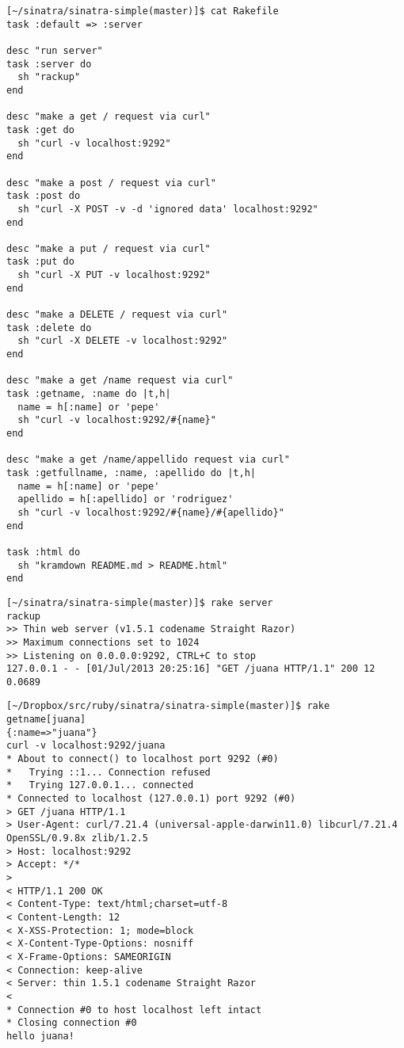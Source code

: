 \begin{verbatim}
[~/sinatra/sinatra-simple(master)]$ cat Rakefile 
task :default => :server

desc "run server"
task :server do
  sh "rackup"
end

desc "make a get / request via curl"
task :get do
  sh "curl -v localhost:9292"
end

desc "make a post / request via curl"
task :post do
  sh "curl -X POST -v -d 'ignored data' localhost:9292"
end

desc "make a put / request via curl"
task :put do
  sh "curl -X PUT -v localhost:9292"
end

desc "make a DELETE / request via curl"
task :delete do
  sh "curl -X DELETE -v localhost:9292"
end

desc "make a get /name request via curl"
task :getname, :name do |t,h|
  name = h[:name] or 'pepe'
  sh "curl -v localhost:9292/#{name}"
end

desc "make a get /name/appellido request via curl"
task :getfullname, :name, :apellido do |t,h|
  name = h[:name] or 'pepe'
  apellido = h[:apellido] or 'rodriguez'
  sh "curl -v localhost:9292/#{name}/#{apellido}"
end

task :html do
  sh "kramdown README.md > README.html"
end
\end{verbatim}


\begin{verbatim}
[~/sinatra/sinatra-simple(master)]$ rake server
rackup
>> Thin web server (v1.5.1 codename Straight Razor)
>> Maximum connections set to 1024
>> Listening on 0.0.0.0:9292, CTRL+C to stop
127.0.0.1 - - [01/Jul/2013 20:25:16] "GET /juana HTTP/1.1" 200 12 0.0689
\end{verbatim}


\begin{verbatim}
[~/Dropbox/src/ruby/sinatra/sinatra-simple(master)]$ rake getname[juana]
{:name=>"juana"}
curl -v localhost:9292/juana
* About to connect() to localhost port 9292 (#0)
*   Trying ::1... Connection refused
*   Trying 127.0.0.1... connected
* Connected to localhost (127.0.0.1) port 9292 (#0)
> GET /juana HTTP/1.1
> User-Agent: curl/7.21.4 (universal-apple-darwin11.0) libcurl/7.21.4 OpenSSL/0.9.8x zlib/1.2.5
> Host: localhost:9292
> Accept: */*
> 
< HTTP/1.1 200 OK
< Content-Type: text/html;charset=utf-8
< Content-Length: 12
< X-XSS-Protection: 1; mode=block
< X-Content-Type-Options: nosniff
< X-Frame-Options: SAMEORIGIN
< Connection: keep-alive
< Server: thin 1.5.1 codename Straight Razor
< 
* Connection #0 to host localhost left intact
* Closing connection #0
hello juana!
\end{verbatim}

